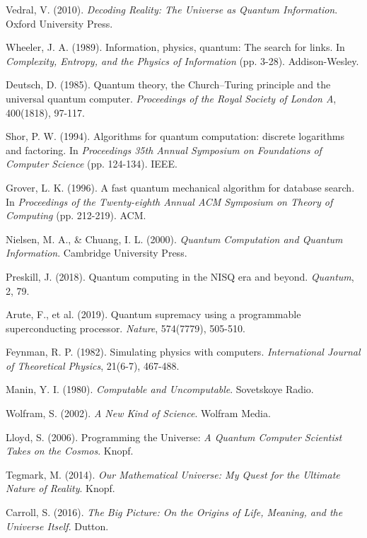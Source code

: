 \documentclass[12pt,a4paper]{article}
\begin{document}
\begin{thebibliography}{99}
Vedral, V. (2010). \textit{Decoding Reality: The Universe as Quantum Information}. Oxford University Press.

Wheeler, J. A. (1989). Information, physics, quantum: The search for links. In \textit{Complexity, Entropy, and the Physics of Information} (pp. 3-28). Addison-Wesley.

Deutsch, D. (1985). Quantum theory, the Church–Turing principle and the universal quantum computer. \textit{Proceedings of the Royal Society of London A}, 400(1818), 97-117.

Shor, P. W. (1994). Algorithms for quantum computation: discrete logarithms and factoring. In \textit{Proceedings 35th Annual Symposium on Foundations of Computer Science} (pp. 124-134). IEEE.

Grover, L. K. (1996). A fast quantum mechanical algorithm for database search. In \textit{Proceedings of the Twenty-eighth Annual ACM Symposium on Theory of Computing} (pp. 212-219). ACM.

Nielsen, M. A., \& Chuang, I. L. (2000). \textit{Quantum Computation and Quantum Information}. Cambridge University Press.

Preskill, J. (2018). Quantum computing in the NISQ era and beyond. \textit{Quantum}, 2, 79.

Arute, F., et al. (2019). Quantum supremacy using a programmable superconducting processor. \textit{Nature}, 574(7779), 505-510.

Feynman, R. P. (1982). Simulating physics with computers. \textit{International Journal of Theoretical Physics}, 21(6-7), 467-488.

Manin, Y. I. (1980). \textit{Computable and Uncomputable}. Sovetskoye Radio.

Wolfram, S. (2002). \textit{A New Kind of Science}. Wolfram Media.

Lloyd, S. (2006). Programming the Universe: \textit{A Quantum Computer Scientist Takes on the Cosmos}. Knopf.

Tegmark, M. (2014). \textit{Our Mathematical Universe: My Quest for the Ultimate Nature of Reality}. Knopf.

Carroll, S. (2016). \textit{The Big Picture: On the Origins of Life, Meaning, and the Universe Itself}. Dutton.


\end{thebibliography}
\end{document}
